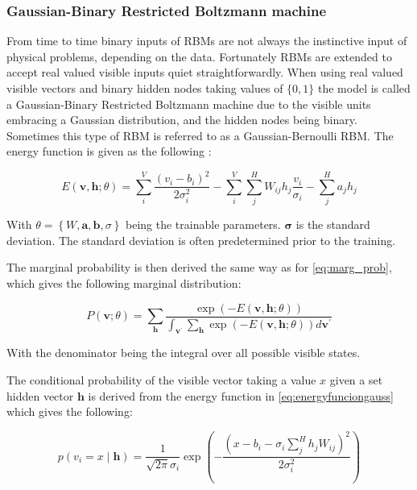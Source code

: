 \documentclass[../main.tex]{subfiles}
\begin{document}
\subsubsection{Gaussian-Binary Restricted Boltzmann machine}
From time to time binary inputs of RBMs are not always the instinctive input of physical problems, depending on the data. Fortunately RBMs are extended to accept real valued visible inputs quiet straightforwardly. When using real valued visible vectors and binary hidden nodes taking values of $\{0,1\}$ the model is called a Gaussian-Binary Restricted Boltzmann machine due to the visible units embracing a Gaussian distribution, and the hidden nodes being binary. Sometimes this type of RBM is referred to as a Gaussian-Bernoulli RBM. The energy function is given as the following \cite{rbm_article}:

\begin{equation}
E(\mathbf{v}, \mathbf{h} ; \theta)=\sum_{i}^{V} \frac{\left(v_{i}-b_{i}\right)^{2}}{2 \sigma_{i}^{2}}-\sum_{i}^{V} \sum_{j}^{H} W_{i j} h_{j} \frac{v_{i}}{\sigma_{i}}-\sum_{j}^{H} a_{j} h_{j}
\label{eq:energyfunciongauss}
\end{equation}

With $\theta=\left\{W, \mathbf{a}, \mathbf{b}, \sigma \right\}$ being the trainable parameters. $\mathbf{\sigma}$ is the standard deviation. The standard deviation is often predetermined prior to the training.

The marginal probability is then derived the same way as for \autoref{eq:marg_prob}, which gives the following marginal distribution:

\begin{equation*}
P(\mathbf{v} ; \theta)=\sum_{\mathbf{h}} \frac{\exp (-E(\mathbf{v}, \mathbf{h} ; \theta))}{\int_{\mathbf{v}^{\prime}} \sum_{\mathbf{h}} \exp (-E(\mathbf{v}, \mathbf{h} ; \theta)) d \mathbf{v}^{\prime}}
\end{equation*}

With the denominator being the integral over all possible visible states.

The conditional probability of the visible vector taking a value $x$ given a set hidden vector $\mathbf{h}$ is derived from the energy function in \autoref{eq:energyfunciongauss} which gives the following:

\begin{equation}
p\left(v_{i}=x \mid \mathbf{h}\right)=\frac{1}{\sqrt{2 \pi} \sigma_{i}} \exp \left(-\frac{\left(x-b_{i}-\sigma_{i} \sum_{j}^H h_{j} W_{i j}\right)^{2}}{2 \sigma_{i}^{2}}\right)
\label{eq:CP_CV}
\end{equation}
\end{document}
